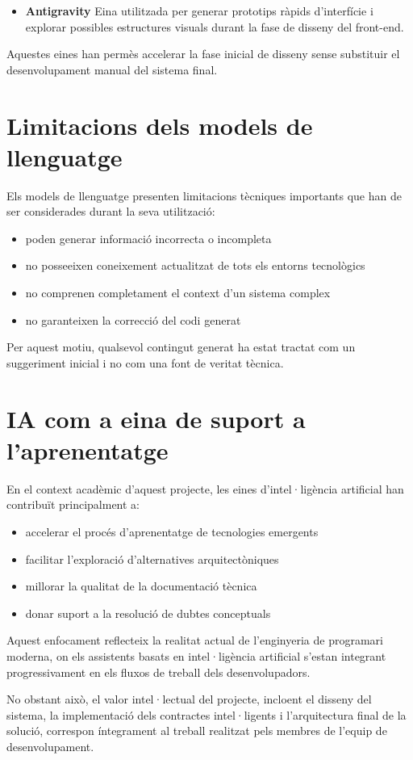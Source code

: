\begin{itemize}

\item \textbf{Antigravity}  
Eina utilitzada per generar prototips ràpids d’interfície i explorar possibles estructures visuals durant la fase de disseny del front-end.

\end{itemize}

Aquestes eines han permès accelerar la fase inicial de disseny sense substituir el desenvolupament manual del sistema final.

\section{Limitacions dels models de llenguatge}

Els models de llenguatge presenten limitacions tècniques importants que han de ser considerades durant la seva utilització:

\begin{itemize}

\item poden generar informació incorrecta o incompleta
\item no posseeixen coneixement actualitzat de tots els entorns tecnològics
\item no comprenen completament el context d’un sistema complex
\item no garanteixen la correcció del codi generat

\end{itemize}

Per aquest motiu, qualsevol contingut generat ha estat tractat com un suggeriment inicial i no com una font de veritat tècnica.

\section{IA com a eina de suport a l’aprenentatge}

En el context acadèmic d’aquest projecte, les eines d’intel·ligència artificial han contribuït principalment a:

\begin{itemize}

\item accelerar el procés d’aprenentatge de tecnologies emergents
\item facilitar l’exploració d’alternatives arquitectòniques
\item millorar la qualitat de la documentació tècnica
\item donar suport a la resolució de dubtes conceptuals

\end{itemize}

Aquest enfocament reflecteix la realitat actual de l’enginyeria de programari moderna, on els assistents basats en intel·ligència artificial s’estan integrant progressivament en els fluxos de treball dels desenvolupadors.

No obstant això, el valor intel·lectual del projecte, incloent el disseny del sistema, la implementació dels contractes intel·ligents i l’arquitectura final de la solució, correspon íntegrament al treball realitzat pels membres de l’equip de desenvolupament.